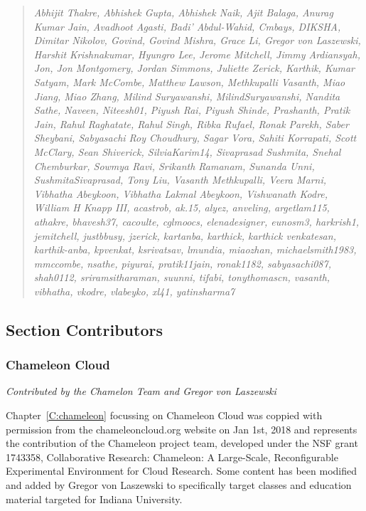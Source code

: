 \begin{quotation}{\em
Abhijit Thakre, Abhishek Gupta, Abhishek Naik, Ajit Balaga, Anurag
Kumar Jain, Avadhoot Agasti, Badi' Abdul-Wahid, Cmbays, DIKSHA,
Dimitar Nikolov, Govind, Govind Mishra, Grace Li, Gregor von
Laszewski, Harshit Krishnakumar, Hyungro Lee, Jerome Mitchell, Jimmy
Ardiansyah, Jon, Jon Montgomery, Jordan Simmons, Juliette Zerick,
Karthik, Kumar Satyam, Mark McCombe, Matthew Lawson, Methkupalli
Vasanth, Miao Jiang, Miao Zhang, Milind Suryawanshi,
MilindSuryawanshi, Nandita Sathe, Naveen, Niteesh01, Piyush Rai,
Piyush Shinde, Prashanth, Pratik Jain, Rahul Raghatate, Rahul Singh,
Ribka Rufael, Ronak Parekh, Saber Sheybani, Sabyasachi Roy Choudhury,
Sagar Vora, Sahiti Korrapati, Scott McClary, Sean Shiverick,
SilviaKarim14, Sivaprasad Sushmita, Snehal Chemburkar, Sowmya Ravi,
Srikanth Ramanam, Sunanda Unni, SushmitaSivaprasad, Tony Liu, Vasanth
Methkupalli, Veera Marni, Vibhatha Abeykoon, Vibhatha Lakmal Abeykoon,
Vishwanath Kodre, William H Knapp III, acastrob, ak.15, alyez,
anveling, argetlam115, athakre, bhavesh37, cacoulte, cglmoocs,
elenadesigner, eunosm3, harkrish1, jemitchell, justbbusy, jzerick,
kartanba, karthick, karthick venkatesan, karthik-anba, kpvenkat,
ksrivatsav, lmundia, miaozhan, michaelsmith1983, mmccombe, nsathe,
piyurai, pratik11jain, ronak1182, sabyasachi087,
shah0112, sriramsitharaman, suunni, tifabi, tonythomascn, vasanth,
vibhatha, vkodre, vlabeyko, xl41, yatinsharma7
}\end{quotation}

\subsection{Section Contributors}

\subsubsection{Chameleon Cloud}

\textit{Contributed by the Chamelon Team and Gregor von Laszewski}

Chapter~\ref{C:chameleon} focussing on Chameleon Cloud was coppied
with permission from the chameleoncloud.org website on Jan 1st, 2018 and
represents the contribution of the Chameleon project team, developed
under the NSF grant 1743358, Collaborative Research: Chameleon: A
Large-Scale, Reconfigurable Experimental Environment for Cloud
Research. Some content has been modified and added by Gregor von
Laszewski to specifically target classes and education material
targeted for Indiana University.

